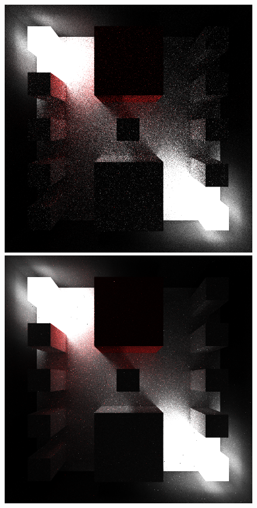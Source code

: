 \documentclass[ %
                    author={Callum Pearce},
                supervisor={Dr. Neill Campbell},
                    degree={MEng},
                     title={Learning the incident radiance for a continuous state space rather than a discrete one is more beneficial for Importance Sampling in Monte Carlo Path tracing},
                  subtitle={},
                      type={research},
                      year={2019} ]{dissertation}
\begin{document}
\begin{figure}[h]
\centering
{}
  \includegraphics[width=\textwidth]{images/renders/complex_pillars/default.png}   
\endminipage\hspace{1em}
  \includegraphics[width=\textwidth]{images/renders/complex_pillars/sarsa.png}   

\end{figure}
\end{document}
